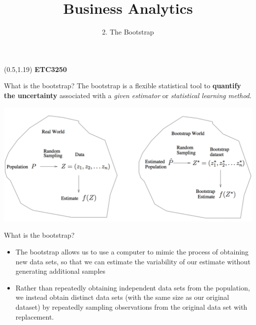 \documentclass[14pt]{beamer}
\title[2. The Bootstrap]{Business Analytics}
\author{2. The Bootstrap}
\begin{document}
\begin{frame}[plain]{}
\maketitle
\begin{textblock}{11}(0.5,1.19){\color{white}\large
\textbf{ETC3250}}
\end{textblock}
\end{frame}

\begin{frame}[plain]{What is the bootstrap?}
%
The bootstrap is a flexible statistical tool to \textbf{quantify the uncertainty} associated with a \emph{given estimator} or \emph{statistical learning method}.
\begin{center}
\includegraphics[width=1\textwidth]{general-bootstrap}	
\end{center}
\end{frame}

\begin{frame}[plain]{What is the bootstrap?}

\begin{itemize}
	\item  The bootstrap allows us to use a computer to mimic the process of obtaining new data sets, so that we can estimate the variability of our estimate without generating additional samples
	\item Rather than repeatedly obtaining independent data sets
from the population, we instead obtain distinct data sets (with the same size as our original dataset) by repeatedly sampling observations from the original data set with replacement.
\end{itemize}
\end{frame}
\end{document}
